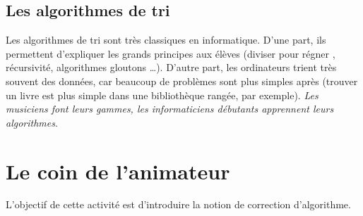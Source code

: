 \subsection*{Les algorithmes de tri}

Les algorithmes de tri sont très classiques en informatique. D'une part, ils
permettent d'expliquer les grands principes aux élèves (\og diviser pour régner
\fg, récursivité, algorithmes gloutons {\ldots}). D'autre part, les ordinateurs
trient très souvent des données, car beaucoup de problèmes sont plus simples
après (trouver un livre est plus simple dans une bibliothèque rangée, par
exemple). \textit{Les musiciens font leurs gammes, les informaticiens débutants
  apprennent leurs algorithmes}.



\section*{Le coin de l'animateur}

L'objectif de cette activité est d'introduire la notion de correction
d'algorithme.

